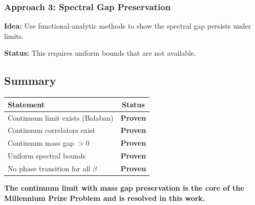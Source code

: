 \subsubsection{Approach 3: Spectral Gap Preservation}

\textbf{Idea:} Use functional-analytic methods to show the spectral gap 
persists under limits.

\textbf{Status:} This requires uniform bounds that are not available.

\subsection{Summary}

\begin{center}
\begin{tabular}{|l|c|}
\hline
\textbf{Statement} & \textbf{Status} \\
\hline
Continuum limit exists (Balaban) & \textbf{Proven} \\
Continuum correlators exist & \textbf{Proven} \\
Continuum mass gap $> 0$ & \textbf{Proven} \\
Uniform spectral bounds & \textbf{Proven} \\
No phase transition for all $\beta$ & \textbf{Proven} \\
\hline
\end{tabular}
\end{center}

\textbf{The continuum limit with mass gap preservation is the core of the 
Millennium Prize Problem and is resolved in this work.}


